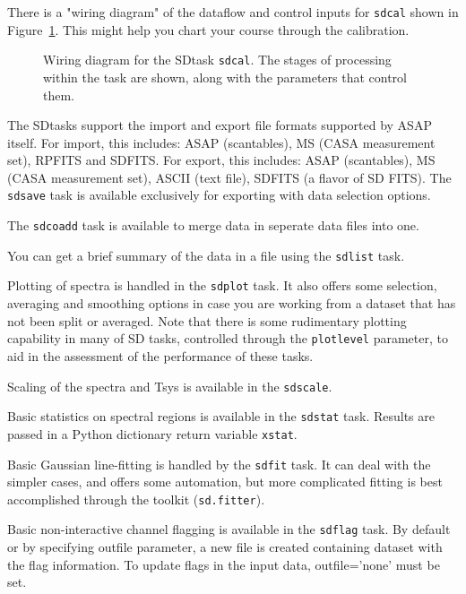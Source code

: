 There is a "wiring diagram" of the dataflow and control inputs for
{\tt sdcal} shown in Figure~\ref{fig:sdcal}.  This might help 
you chart your course through the calibration.

\begin{figure}[h!]
\caption{\label{fig:sdcal} Wiring diagram for the SDtask {\tt sdcal}.
The stages of processing within the task are shown, along with the
parameters that control them. }
\hrulefill
\end{figure}

The SDtasks support the import and export file formats supported
by ASAP itself.  For import, this includes:  ASAP (scantables), 
MS (CASA measurement set), RPFITS and SDFITS.  For export, this
includes: ASAP (scantables), MS (CASA measurement set),
ASCII (text file), SDFITS (a flavor of SD FITS).
The {\tt sdsave} task is available exclusively for exporting with 
data selection options.

The {\tt sdcoadd} task is available to merge data in seperate data files
into one.

You can get a brief summary of the data in a file using the {\tt sdlist}
task.

Plotting of spectra is handled in the {\tt sdplot} task.  It also offers
some selection, averaging and smoothing options in case you are
working from a dataset that has not been split or averaged.  Note that
there is some rudimentary plotting capability in many of SD 
tasks, controlled through the {\tt plotlevel} parameter, 
to aid in the assessment of the performance of these tasks.

Scaling of the spectra and Tsys is available in the {\tt sdscale}.

Basic statistics on spectral regions is available in the {\tt sdstat} task.
Results are passed in a Python dictionary return variable {\tt xstat}.

Basic Gaussian line-fitting is handled by the {\tt sdfit} task.  It can deal
with the simpler cases, and offers some automation, but more complicated
fitting is best accomplished through the toolkit ({\tt sd.fitter}).

Basic non-interactive channel flagging is available in the {\tt sdflag} task.
By default or by specifying outfile parameter, a new file is created containing 
dataset with the flag information. To update flags in the input data,
outfile='none' must be set.


